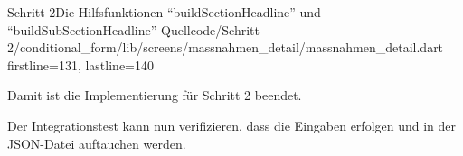 \begin{alexlisting}{Schritt 2}{Die Hilfsfunktionen \enquote{buildSectionHeadline} und \enquote{buildSubSectionHeadline}}
  {Quellcode/Schritt-2/conditional_form/lib/screens/massnahmen_detail/massnahmen_detail.dart}
  {firstline=131, lastline=140}
  \label{lst:Schritt2buildSectionHeadlineBuildSubSectionHeadline}
\end{alexlisting}

Damit ist die Implementierung für Schritt 2 beendet.

Der Integrationstest kann nun verifizieren, dass die Eingaben erfolgen und in der JSON-Datei auftauchen werden.

